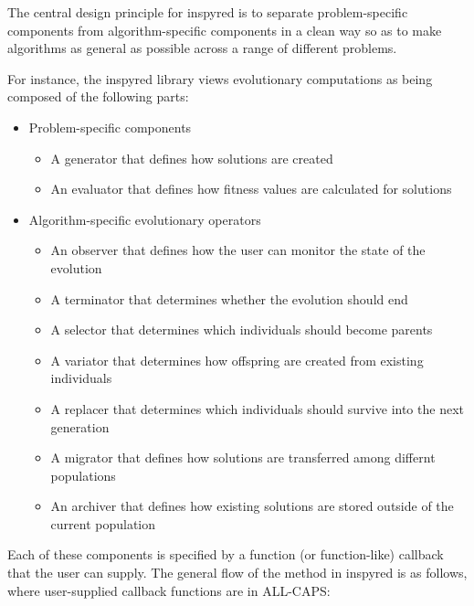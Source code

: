 \documentclass[letterpaper,10pt,english]{sphinxmanual}
\begin{document}
The central design principle for inspyred is to separate problem-specific components from algorithm-specific components in a clean way so as to make algorithms as general as possible across a range of different problems.

For instance, the inspyred library views evolutionary computations as being composed of the following parts:
\begin{itemize}
\item {} 
Problem-specific components
\begin{itemize}
\item {} 
A generator that defines how solutions are created

\item {} 
An evaluator that defines how fitness values are calculated for solutions

\end{itemize}

\item {} 
Algorithm-specific evolutionary operators
\begin{itemize}
\item {} 
An observer that defines how the user can monitor the state of the evolution

\item {} 
A terminator that determines whether the evolution should end

\item {} 
A selector that determines which individuals should become parents

\item {} 
A variator that determines how offspring are created from existing individuals

\item {} 
A replacer that determines which individuals should survive into the next generation

\item {} 
A migrator that defines how solutions are transferred among differnt populations

\item {} 
An archiver that defines how existing solutions are stored outside of the current population

\end{itemize}

\end{itemize}

Each of these components is specified by a function (or function-like) callback that the user can supply. The general flow of the  method in inspyred is as follows, where user-supplied callback functions are in ALL-CAPS:
\end{document}
